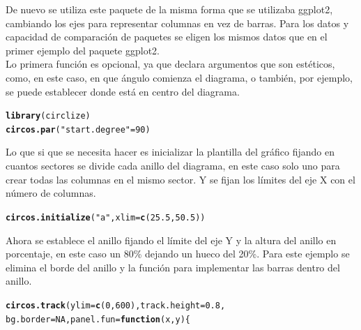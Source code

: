 \documentclass{article}\usepackage[]{graphicx}\usepackage[]{color}
\makeatletter
\newcommand{\hlnum}[1]{\textcolor[rgb]{0.686,0.059,0.569}{#1}}%
\newcommand{\hlstr}[1]{\textcolor[rgb]{0.192,0.494,0.8}{#1}}%
\newcommand{\hlstd}[1]{\textcolor[rgb]{0.345,0.345,0.345}{#1}}%
\newcommand{\hlkwc}[1]{\textcolor[rgb]{0.333,0.667,0.333}{#1}}%
\newcommand{\hlkwd}[1]{\textcolor[rgb]{0.737,0.353,0.396}{\textbf{#1}}}%
\newenvironment{kframe}{%
 \def\at@end@of@kframe{}%
 \ifinner\ifhmode%
  \def\at@end@of@kframe{\end{minipage}}%
  \begin{minipage}{\columnwidth}%
 \fi\fi%
 \def\FrameCommand##1{\hskip\@totalleftmargin \hskip-\fboxsep
 \colorbox{shadecolor}{##1}\hskip-\fboxsep
     \hskip-\linewidth \hskip-\@totalleftmargin \hskip\columnwidth}%
 \MakeFramed {\advance\hsize-\width
   \@totalleftmargin\z@ \linewidth\hsize
   \@setminipage}}%
 {\par\unskip\endMakeFramed%
 \at@end@of@kframe}
\newenvironment{knitrout}{}{} %
\makeatother
\begin{document}
De nuevo se utiliza este paquete%
de la misma forma que se utilizaba ggplot2, cambiando los ejes para representar columnas en vez de barras. Para los datos y capacidad de comparaci\'on de paquetes se eligen los mismos datos que en el primer ejemplo del paquete ggplot2.~\\
Lo primera funci\'on es opcional, ya que declara argumentos que son est\'eticos, como, en este caso, en que \'angulo comienza el diagrama, o tambi\'en, por ejemplo, se puede establecer donde est\'a en centro del diagrama.
\begin{knitrout}
\color{fgcolor}\begin{kframe}
\begin{alltt}
\hlkwd{library}\hlstd{(circlize)}
\hlkwd{circos.par}\hlstd{(}\hlstr{"start.degree"} \hlstd{=} \hlnum{90}\hlstd{)}
\end{alltt}
\end{kframe}
\end{knitrout}
Lo que si que se necesita hacer es inicializar la plantilla del gr\'afico fijando en cuantos sectores se divide cada anillo del diagrama, en este caso solo uno para crear todas las columnas en el mismo sector. Y se fijan los l\'imites del eje X con el n\'umero de columnas.
\begin{knitrout}
\color{fgcolor}\begin{kframe}
\begin{alltt}
\hlkwd{circos.initialize}\hlstd{(}\hlstr{"a"}\hlstd{,} \hlkwc{xlim} \hlstd{=} \hlkwd{c}\hlstd{(}\hlnum{25.5}\hlstd{,}\hlnum{50.5}\hlstd{))}
\end{alltt}
\end{kframe}
\end{knitrout}
Ahora se establece el anillo fijando el l\'imite del eje Y y la altura del anillo en porcentaje, en este caso un 80\% dejando un hueco del 20\%. Para este ejemplo se elimina el borde del anillo y la funci\'on para implementar las barras dentro del anillo.
\begin{knitrout}
\color{fgcolor}\begin{kframe}
\begin{alltt}
\hlkwd{circos.track}(ylim = \hlkwd{c}(0,600), track.height = 0.8, 
             bg.border = NA, panel.fun = \hlkwd{function}(x, y) \{
\end{alltt}
\end{kframe}
\end{knitrout}
\end{document}
